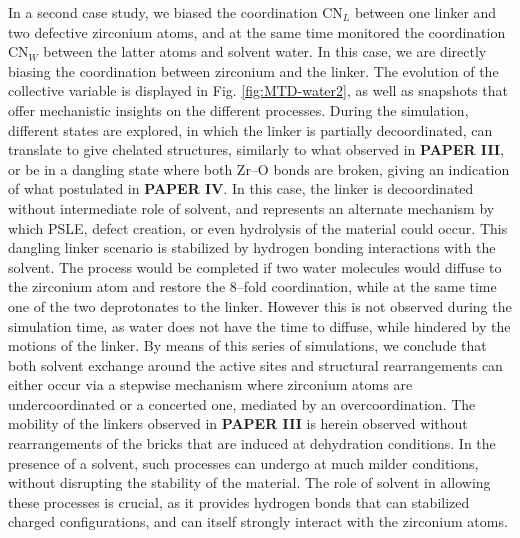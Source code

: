 In a second case study, we biased the coordination CN$_L$ between one linker and two defective zirconium atoms, and at the same time monitored the coordination CN$_W$ between the latter atoms and solvent water. In this case, we are directly biasing the coordination between zirconium and the linker. The evolution of the collective variable is displayed in Fig. \ref{fig:MTD-water2}, as well as snapshots that offer mechanistic insights on the different processes. During the simulation, different states are explored, in which the linker is partially decoordinated, can translate to give chelated structures, similarly to what observed in \textbf{PAPER III}, or be in a dangling state where both Zr--O bonds are broken, giving an indication of what postulated in \textbf{PAPER IV}. In this case, the linker is decoordinated without intermediate role of solvent, and represents an alternate mechanism by which PSLE, defect creation, or even hydrolysis of the material could occur. This dangling linker scenario is stabilized by hydrogen bonding interactions with the solvent. The process would be completed if two water molecules would diffuse to the zirconium atom and restore the 8--fold coordination, while at the same time one of the two deprotonates to the linker. However this is not observed during the simulation time, as water does not have the time to diffuse, while hindered by the motions of the linker.
\npar
By means of this series of simulations, we conclude that both solvent exchange around the active sites and structural rearrangements can either occur via a stepwise mechanism where zirconium atoms are undercoordinated or a concerted one, mediated by an overcoordination. The mobility of the linkers observed in \textbf{PAPER III} is herein observed without rearrangements of the bricks that are induced at dehydration conditions. In the presence of a solvent, such processes can undergo at much milder conditions, without disrupting the stability of the material. The role of solvent in allowing these processes is crucial, as it provides hydrogen bonds that can stabilized charged configurations, and can itself strongly interact with the zirconium atoms.

\clearpage{\pagestyle{empty}\cleardoublepage}